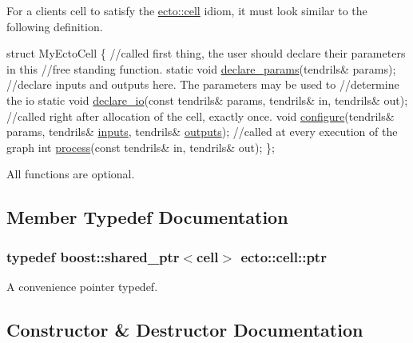 For a client\textquotesingle{}s cell to satisfy the \hyperlink{structecto_1_1cell}{ecto\+::cell} idiom, it must look similar to the following definition. 
\begin{DoxyCode}
\textcolor{keyword}{struct }MyEctoCell
\{
  \textcolor{comment}{//called first thing, the user should declare their parameters in this}
  \textcolor{comment}{//free standing function.}
  \textcolor{keyword}{static} \textcolor{keywordtype}{void} \hyperlink{structecto_1_1cell_a5c3c204f531de15920cb9d3db3ecfc4c}{declare\_params}(tendrils& params);
  \textcolor{comment}{//declare inputs and outputs here. The parameters may be used to}
  \textcolor{comment}{//determine the io}
  \textcolor{keyword}{static} \textcolor{keywordtype}{void} \hyperlink{structecto_1_1cell_af6c3782ed0d1c258bcf5050b4af272b4}{declare\_io}(\textcolor{keyword}{const} tendrils& params, tendrils& in, tendrils& out);
  \textcolor{comment}{//called right after allocation of the cell, exactly once.}
  \textcolor{keywordtype}{void} \hyperlink{structecto_1_1cell_a30d48d21d6ffa86af4888f78e92241af}{configure}(tendrils& params, tendrils& \hyperlink{structecto_1_1cell_a65099b0458a7761b8bfa7a1ddc17e92f}{inputs}, tendrils& 
      \hyperlink{structecto_1_1cell_a93951743b603faba35312ebdb07ceb22}{outputs});
  \textcolor{comment}{//called at every execution of the graph}
  \textcolor{keywordtype}{int} \hyperlink{structecto_1_1cell_a6b810671ee21f5dddbc1206abfb999f3}{process}(\textcolor{keyword}{const} tendrils& in, tendrils& out);
\};
\end{DoxyCode}


All functions are optional. 

\subsection{Member Typedef Documentation}
\hypertarget{structecto_1_1cell_af2cab9d2bc012088c4f58c40da57a862}{}
\subsubsection[{ptr}]{\setlength{\rightskip}{0pt plus 5cm}typedef boost\+::shared\+\_\+ptr$<${\bf cell}$>$ {\bf ecto\+::cell\+::ptr}}\label{structecto_1_1cell_af2cab9d2bc012088c4f58c40da57a862}


A convenience pointer typedef. 



\subsection{Constructor \& Destructor Documentation}
\hypertarget{structecto_1_1cell_a782c9d0f521f8a34c8eed309d0d8d79a}{}
